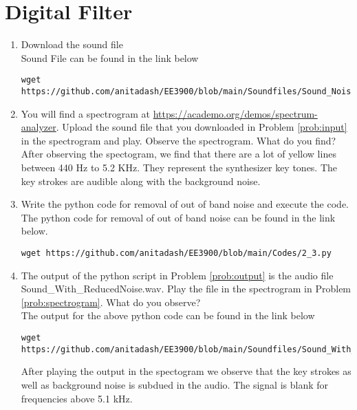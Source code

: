 \documentclass[journal,12pt,twocolumn]{IEEEtran}
\renewcommand\thesection{\arabic{section}}
\begin{document}
\section{Digital Filter}
\begin{enumerate}[label=\thesection.\arabic*
,ref=\thesection.\theenumi]

\item
\label{prob:input}
Download the sound file
\\
\solution Sound File can be found in the link below
\begin{lstlisting}
wget https://github.com/anitadash/EE3900/blob/main/Soundfiles/Sound_Noise.wav
\end{lstlisting}


\item
\label{prob:spectrogram}
You will find a spectrogram at \href{https://academo.org/demos/spectrum-analyzer}{\url{https://academo.org/demos/spectrum-analyzer}}.
Upload the sound file that you downloaded in Problem \ref{prob:input} in the spectrogram  and play.  Observe the spectrogram. What do you find?
\\ 
\solution After observing the spectogram, we find that there are a lot of yellow lines between 440 Hz to 5.2 KHz.
They represent the synthesizer key tones. The key strokes are audible along with the background noise.


\item
\label{prob:output}
Write the python code for removal of out of band noise and execute the code.
\\
\solution The python code for removal of out of band noise can be found in the link below.
\begin{lstlisting}
wget https://github.com/anitadash/EE3900/blob/main/Codes/2_3.py
\end{lstlisting}


\item
The output of the python script in Problem \ref{prob:output} is the audio file Sound\_With\_ReducedNoise.wav. Play the file in the spectrogram in Problem \ref{prob:spectrogram}. What do you observe?
\\
\solution The output for the above python code can be found in the link below
\begin{lstlisting}
wget https://github.com/anitadash/EE3900/blob/main/Soundfiles/Sound_With_ReducedNoise.wav
\end{lstlisting}
After playing the output in the spectogram we observe that the key strokes as well as background noise is subdued in the audio. The signal is blank for frequencies above 5.1 kHz.
\end{enumerate}
\end{document}
